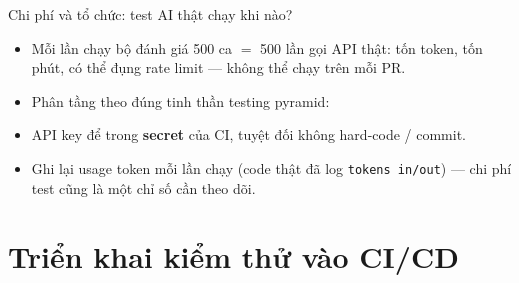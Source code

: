 \documentclass[aspectratio=169,12pt]{beamer}
\begin{document}
\begin{frame}{Chi phí và tổ chức: test AI thật chạy khi nào?}
  \begin{itemize}
    \item Mỗi lần chạy bộ đánh giá 500 ca $=$ 500 lần gọi API thật: tốn token, tốn phút, có thể đụng rate limit --- \alert{không thể} chạy trên mỗi PR.
    \item Phân tầng theo đúng tinh thần testing pyramid:
  \end{itemize}
  \small
  \begin{table}
    \small
  \end{table}
  \begin{itemize}
    \item API key để trong \textbf{secret} của CI, tuyệt đối không hard-code / commit.
    \item Ghi lại usage token mỗi lần chạy (code thật đã log \texttt{tokens in/out}) --- chi phí test cũng là một chỉ số cần theo dõi.
  \end{itemize}
\end{frame}

\section{Triển khai kiểm thử vào CI/CD}
\end{document}
